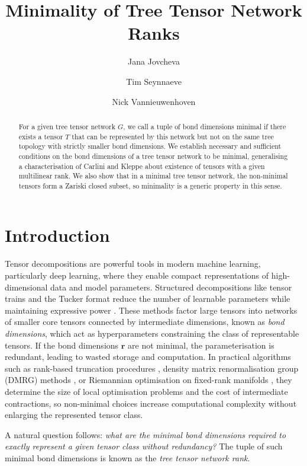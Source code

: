\documentclass{amsart}
\title{Minimality of Tree Tensor Network Ranks}
\author{Jana Jovcheva}
\author{Tim Seynnaeve}
\author{Nick Vannieuwenhoven}
\theoremstyle{plain}
\theoremstyle{definition}
\theoremstyle{remark}
\begin{document}

\begin{abstract}
For a given tree tensor network $G$, we call a tuple of bond dimensions minimal if there exists a tensor $T$ that can be represented by this network but not on the same tree topology with strictly smaller bond dimensions. We establish necessary and sufficient conditions on the bond dimensions of a tree tensor network to be minimal, generalising a characterisation of Carlini and Kleppe about existence of tensors with a given multilinear rank. We also show that in a minimal tree tensor network, the non-minimal tensors form a Zariski closed subset, so minimality is a generic property in this sense.
\end{abstract}

\maketitle

\section{Introduction}
Tensor decompositions are powerful tools in modern machine learning, particularly deep learning, where they enable compact representations of high-dimensional data and model parameters. Structured decompositions like tensor trains and the Tucker format reduce the number of learnable parameters while maintaining expressive power \cite{Sidiropoulos_2017, stoundenmire}. These methods factor large tensors into networks of smaller core tensors connected by intermediate dimensions, known as \textit{bond dimensions}, which act as hyperparameters constraining the class of representable tensors. If the bond dimensions $\mathbf r$ are not minimal, the parameterisation is redundant, leading to wasted storage and computation. In practical algorithms such as rank-based truncation procedures \cite{grasedyckIntroductionHierarchicalRank2011}, density matrix renormalisation group (DMRG) methods \cite{SCHOLLWOCK201196}, or Riemannian optimisation on fixed-rank manifolds \cite{holtzManifoldsTensorsFixed2012, novikov2022}, they determine the size of local optimisation problems and the cost of intermediate contractions, so non-minimal choices increase computational complexity without enlarging the represented tensor class.

A natural question follows: \textit{what are the minimal bond dimensions required to exactly represent a given tensor class without redundancy?} The tuple of such minimal bond dimensions is known as the \textit{tree tensor network rank}.
\end{document}
